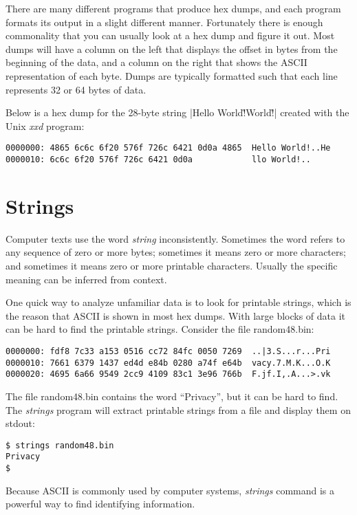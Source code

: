 \documentclass[11pt,letter]{book}
\begin{document}
There are many different programs that produce hex dumps, and each
program formats its output in a slight different manner. Fortunately
there is enough commonality that you can usually look at a hex dump
and figure it out. Most dumps will have a column on the left that
displays the offset in bytes from the beginning of the data, and a
column on the right that shows the ASCII representation of each
byte. Dumps are typically formatted such that each line represents 32
or 64 bytes of data.

Below is a hex dump for the 28-byte string 
|Hello World!\r\nHello World!\r\n| created with the Unix \emph{xxd} program:

\begin{Verbatim}
0000000: 4865 6c6c 6f20 576f 726c 6421 0d0a 4865  Hello World!..He
0000010: 6c6c 6f20 576f 726c 6421 0d0a            llo World!..
\end{Verbatim}


\section{Strings}\label{sec:strings}

Computer texts use the word \emph{string} inconsistently. Sometimes
the word refers to any sequence of zero or more bytes; sometimes it
means zero or more characters; and sometimes it means zero or
more printable characters. Usually the specific meaning can be
inferred from context. 

One quick way to analyze unfamiliar data is to look for printable
strings, which is the reason that ASCII is shown in most hex
dumps. With large blocks of data it can be hard to find the printable
strings. Consider the file random48.bin:

\begin{Verbatim}
0000000: fdf8 7c33 a153 0516 cc72 84fc 0050 7269  ..|3.S...r...Pri
0000010: 7661 6379 1437 ed4d e84b 0280 a74f e64b  vacy.7.M.K...O.K
0000020: 4695 6a66 9549 2cc9 4109 83c1 3e96 766b  F.jf.I,.A...>.vk
\end{Verbatim}

The file random48.bin contains the word ``Privacy'', but it can be hard to
find. The \emph{strings} program will extract printable
strings from a file and display them on stdout:

\begin{Verbatim}
$ strings random48.bin 
Privacy
$ 
\end{Verbatim}

Because ASCII is commonly used by computer systems, 
\emph{strings} command is a powerful way to find  identifying
information. 
\end{document}
